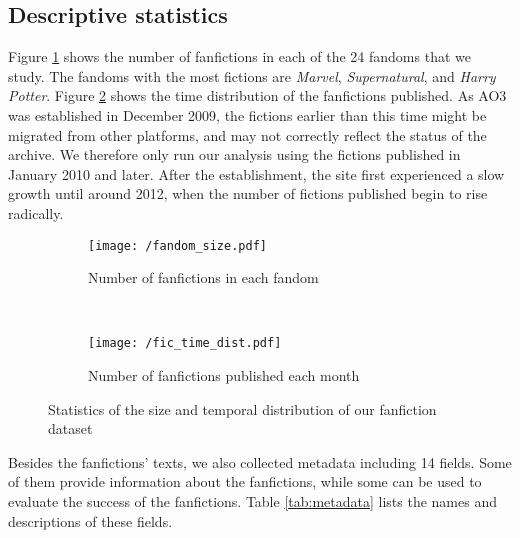 \documentclass[a4paper]{article}
\begin{document}
\subsection*{Descriptive statistics}

Figure \ref{fig:fandom_size} shows the number of fanfictions in each of the 24 fandoms that we study. The fandoms with the most fictions are \emph{Marvel}, \emph{Supernatural}, and \emph{Harry Potter}. Figure \ref{fig:fic_time_dist}  shows the time distribution of the fanfictions published. As AO3 was established in December 2009, the fictions earlier than this time might be migrated from other platforms, and may not correctly reflect the status of the archive. We therefore only run our analysis using the fictions published in January 2010 and later. After the establishment, the site first experienced a slow growth until around 2012, when the number of fictions published begin to rise radically. 

\begin{figure}
    \centering
    \begin{subfigure}[b]{\textwidth}
        \texttt{[image: /fandom\_size.pdf]}
        \caption{Number of fanfictions in each fandom}
        \label{fig:fandom_size}
    \end{subfigure}
    ~ %
    \begin{subfigure}[b]{0.8\textwidth}
        \texttt{[image: /fic\_time\_dist.pdf]}
        \caption{Number of fanfictions published each month}
        \label{fig:fic_time_dist}
    \end{subfigure}
    \caption{Statistics of the size and temporal distribution of our fanfiction dataset}\label{fig:stats_size_time}
\end{figure}

Besides the fanfictions' texts, we also collected metadata including 14 fields. Some of them provide information about the fanfictions, while some can be used to evaluate the success of the fanfictions. Table \ref{tab:metadata} lists the names and descriptions of these fields. 
\end{document}
